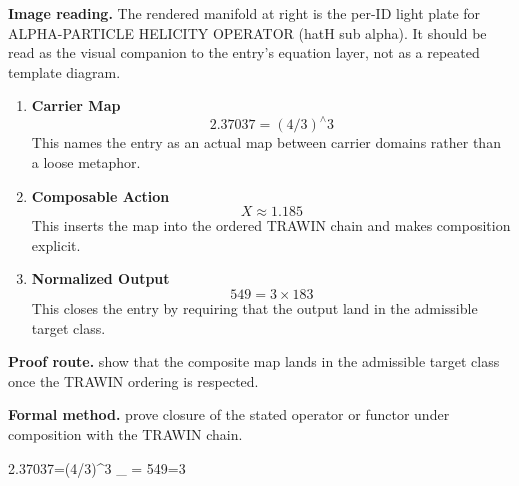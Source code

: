 \begin{samepage}
\noindent\begin{minipage}[t]{0.45\linewidth}
\vspace{0pt}
\raggedright
\scriptsize\textbf{Image reading.} The rendered manifold at right is the per-ID light plate for ALPHA-PARTICLE HELICITY OPERATOR (hatH sub alpha). It should be read as the visual companion to the entry's equation layer, not as a repeated template diagram.\par
\end{minipage}\hfill
\begin{minipage}[t]{0.53\linewidth}
\vspace*{-0.10in}
\raggedright
{}
\end{minipage}
\end{samepage}

\clearpage


\begin{enumerate}[leftmargin=1.6em,itemsep=9pt,topsep=6pt]
\item \textbf{Carrier Map}
\[
2.37037=(4/3)^{\wedge}3
\]
This names the entry as an actual map between carrier domains rather than a loose metaphor.

\item \textbf{Composable Action}
\[
X\approx1.185
\]
This inserts the map into the ordered TRAWIN chain and makes composition explicit.

\item \textbf{Normalized Output}
\[
549=3\times183
\]
This closes the entry by requiring that the output land in the admissible target class.
\end{enumerate}

\textbf{Proof route.} show that the composite map lands in the admissible target class once the TRAWIN ordering is respected.

\textbf{Formal method.} prove closure of the stated operator or functor under composition with the TRAWIN chain.

\medskip
{}

\begin{tzpsnapshot}
\end{tzpsnapshot}

\tzpequationlinks
  {2.37037=(4/3)^{\wedge}3}
  {_{} = \cdots}
  {549=3}
